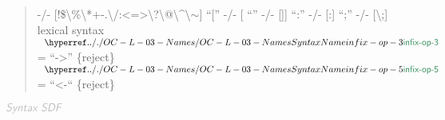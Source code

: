 \begin{quote}
       -/- {[}!\$\textbackslash{}\%\textbackslash{}*+-.\textbackslash{}/:\textless{}=\textgreater{}\textbackslash{}?\textbackslash{}@\textbackslash{}\^{}\textbar{}\textbackslash{}\ensuremath{\sim}{]}\newline
  {}``{[}{}''  -/- {[}\textbar{}{]}\newline
  {}``\textbar{}{}''  -/- {[}{]}{]}\newline
  {}``:{}''  -/- {[}:{]}\newline
  {}``;{}''  -/- {[}\textbackslash{};{]}\newline
\newline
lexical syntax\newline
\newline
  $\SHADE{~~\SYNHYPER{../.}{OC-L-03-Names}{infix-op-3}}$ = {}``-\textgreater{}{}'' \{reject\}\newline
\newline
  $\SHADE{~~\SYNHYPER{../.}{OC-L-03-Names}{infix-op-5}}$ = {}``\textless{}-{}`` \{reject\}
\end{quote}

$\KEY{Syntax SDF}$

